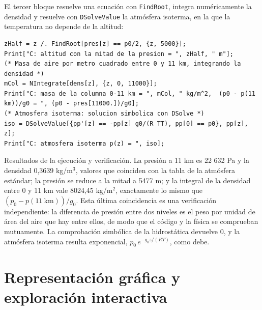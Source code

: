 \documentclass[10pt,openany]{book}
\begin{document}
El tercer bloque resuelve una ecuación con \texttt{FindRoot}, integra numéricamente la densidad y resuelve con \texttt{DSolveValue} la atmósfera isoterma, en la que la temperatura no depende de la altitud:
\begin{lstlisting}[style=studium]
zHalf = z /. FindRoot[pres[z] == p0/2, {z, 5000}];
Print["C: altitud con la mitad de la presion = ", zHalf, " m"];
(* Masa de aire por metro cuadrado entre 0 y 11 km, integrando la densidad *)
mCol = NIntegrate[dens[z], {z, 0, 11000}];
Print["C: masa de la columna 0-11 km = ", mCol, " kg/m^2,  (p0 - p(11 km))/g0 = ", (p0 - pres[11000.])/g0];
(* Atmosfera isoterma: solucion simbolica con DSolve *)
iso = DSolveValue[{pp'[z] == -pp[z] g0/(R TT), pp[0] == p0}, pp[z], z];
Print["C: atmosfera isoterma p(z) = ", iso];
\end{lstlisting}
Resultados de la ejecución y verificación. La presión a 11 km es 22 632 Pa y la densidad 0,3639 kg/m\(^3\), valores que coinciden con la tabla de la atmósfera estándar; la presión se reduce a la mitad a 5477 m; y la integral de la densidad entre 0 y 11 km vale 8024,45 kg/m\(^2\), exactamente lo mismo que \((p_0 - p(11\ \mathrm{km}))/g_0\). Esta última coincidencia es una verificación independiente: la diferencia de presión entre dos niveles es el peso por unidad de área del aire que hay entre ellos, de modo que el código y la física se comprueban mutuamente. La comprobación simbólica de la hidrostática devuelve 0, y la atmósfera isoterma resulta exponencial, \(p_0\,e^{-g_0 z/(R T)}\), como debe.

\section{Representación gráfica y exploración interactiva}
\end{document}

